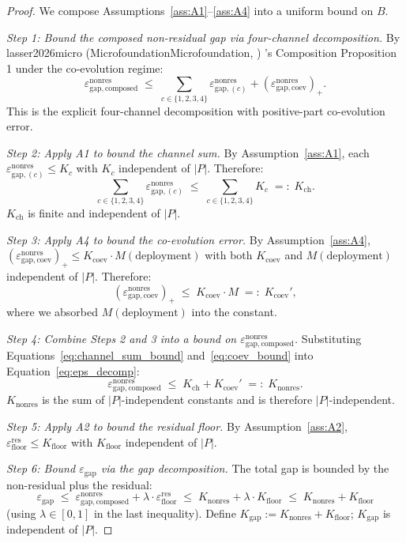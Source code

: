 \documentclass{article}
\makeatletter
\newcommand{\citep}[2][]{%
  \begingroup
  \def\@tmpkey{#2}%
  \ifx\@tmpkey\@empty\else
    (\ifx\@empty#1\@empty\else #1, \fi
     \@nameuse{bibkey@\@tmpkey})%
  \fi
  \endgroup
}
\newcommand{\epsgap}{\varepsilon_{\mathrm{gap}}}
\newcommand{\epsfloor}{\varepsilon_{\mathrm{floor}}^{\mathrm{res}}}
\newcommand{\epsnonresComposed}{\varepsilon_{\mathrm{gap},\mathrm{composed}}^{\mathrm{nonres}}}
\newcommand{\epsnonresChannel}[1]{\varepsilon_{\mathrm{gap},(#1)}^{\mathrm{nonres}}}
\newcommand{\epsnonresCoev}{\varepsilon_{\mathrm{gap},\mathrm{coev}}^{\mathrm{nonres}}}
\makeatother
\begin{document}
\begin{proof}
We compose Assumptions~\ref{ass:A1}--\ref{ass:A4} into a uniform
bound on $B$.

\emph{Step 1: Bound the composed non-residual gap via four-channel
decomposition.}
By
\citep[Microfoundation]{lasser2026micro}'s Composition Proposition 1
under the co-evolution regime:
\begin{equation}
\label{eq:eps_decomp}
  \epsnonresComposed \;\leq\; \sum_{c \in \{1,2,3,4\}}
  \epsnonresChannel{c} + (\epsnonresCoev)_+.
\end{equation}
This is the explicit four-channel decomposition with positive-part
co-evolution error.

\emph{Step 2: Apply A1 to bound the channel sum.}
By Assumption~\ref{ass:A1}, each $\epsnonresChannel{c} \leq K_c$
with $K_c$ independent of $|P|$. Therefore:
\begin{equation}
\label{eq:channel_sum_bound}
  \sum_{c \in \{1,2,3,4\}} \epsnonresChannel{c}
  \;\leq\; \sum_{c \in \{1,2,3,4\}} K_c
  \;=:\; K_{\mathrm{ch}}.
\end{equation}
$K_{\mathrm{ch}}$ is finite and independent of $|P|$.

\emph{Step 3: Apply A4 to bound the co-evolution error.}
By Assumption~\ref{ass:A4}, $(\epsnonresCoev)_+ \leq K_{\mathrm{coev}}
\cdot M(\text{deployment})$ with both $K_{\mathrm{coev}}$ and
$M(\text{deployment})$ independent of $|P|$. Therefore:
\begin{equation}
\label{eq:coev_bound}
  (\epsnonresCoev)_+ \;\leq\; K_{\mathrm{coev}} \cdot M
  \;=:\; K_{\mathrm{coev}}',
\end{equation}
where we absorbed $M(\text{deployment})$ into the constant.

\emph{Step 4: Combine Steps 2 and 3 into a bound on $\epsnonresComposed$.}
Substituting Equations~\ref{eq:channel_sum_bound}
and~\ref{eq:coev_bound} into Equation~\ref{eq:eps_decomp}:
\begin{equation}
\label{eq:eps_total_bound}
  \epsnonresComposed \;\leq\; K_{\mathrm{ch}} + K_{\mathrm{coev}}'
  \;=:\; K_{\mathrm{nonres}}.
\end{equation}
$K_{\mathrm{nonres}}$ is the sum of $|P|$-independent constants and
is therefore $|P|$-independent.

\emph{Step 5: Apply A2 to bound the residual floor.}
By Assumption~\ref{ass:A2}, $\epsfloor \leq K_{\mathrm{floor}}$
with $K_{\mathrm{floor}}$ independent of $|P|$.

\emph{Step 6: Bound $\epsgap$ via the gap decomposition.}
The total gap is bounded by the non-residual plus the residual:
\begin{equation}
\label{eq:eps_gap_total}
  \epsgap \;\leq\; \epsnonresComposed + \lambda \cdot \epsfloor
  \;\leq\; K_{\mathrm{nonres}} + \lambda \cdot K_{\mathrm{floor}}
  \;\leq\; K_{\mathrm{nonres}} + K_{\mathrm{floor}}
\end{equation}
(using $\lambda \in [0,1]$ in the last inequality). Define
$K_{\mathrm{gap}} := K_{\mathrm{nonres}} + K_{\mathrm{floor}}$;
$K_{\mathrm{gap}}$ is independent of $|P|$.


\end{proof}
\end{document}
